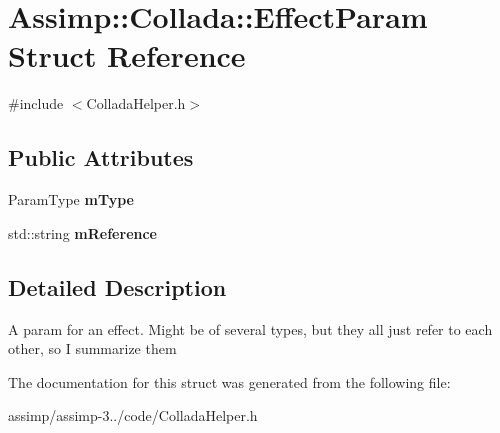 \hypertarget{struct_assimp_1_1_collada_1_1_effect_param}{\section{Assimp\+:\+:Collada\+:\+:Effect\+Param Struct Reference}
\label{struct_assimp_1_1_collada_1_1_effect_param}
}


{\ttfamily \#include $<$Collada\+Helper.\+h$>$}

\subsection*{Public Attributes}
\begin{DoxyCompactItemize}
\item 
\hypertarget{struct_assimp_1_1_collada_1_1_effect_param_afcb872d86884e1b8ab9451fb3cc396e9}{Param\+Type {\bfseries m\+Type}}\label{struct_assimp_1_1_collada_1_1_effect_param_afcb872d86884e1b8ab9451fb3cc396e9}

\item 
\hypertarget{struct_assimp_1_1_collada_1_1_effect_param_aa078298d279d4db444584db95652db5d}{std\+::string {\bfseries m\+Reference}}\label{struct_assimp_1_1_collada_1_1_effect_param_aa078298d279d4db444584db95652db5d}

\end{DoxyCompactItemize}


\subsection{Detailed Description}
A param for an effect. Might be of several types, but they all just refer to each other, so I summarize them 

The documentation for this struct was generated from the following file\+:\begin{DoxyCompactItemize}
\item 
assimp/assimp-\/3../code/Collada\+Helper.\+h\end{DoxyCompactItemize}
